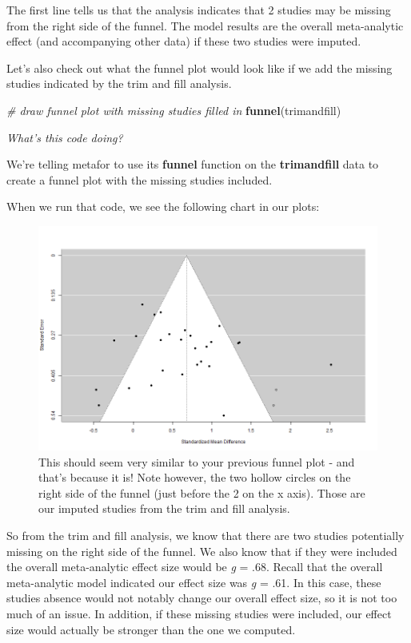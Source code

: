 \documentclass[
]{book}
\newenvironment{Shaded}{\begin{snugshade}}{\end{snugshade}}
\newcommand{\CommentTok}[1]{\textcolor[rgb]{0.56,0.35,0.01}{\textit{#1}}}
\newcommand{\FunctionTok}[1]{\textcolor[rgb]{0.13,0.29,0.53}{\textbf{#1}}}
\newcommand{\NormalTok}[1]{#1}
\begin{document}
The first line tells us that the analysis indicates that 2 studies may be missing from the right side of the funnel. The model results are the overall meta-analytic effect (and accompanying other data) if these two studies were imputed.

Let's also check out what the funnel plot would look like if we add the missing studies indicated by the trim and fill analysis.

\begin{Shaded}
\begin{Highlighting}[]
\CommentTok{\# draw funnel plot with missing studies filled in}
\FunctionTok{funnel}\NormalTok{(trimandfill)}
\end{Highlighting}
\end{Shaded}

\emph{What's this code doing?}

We're telling metafor to use its \textbf{funnel} function on the \textbf{trimandfill} data to create a funnel plot with the missing studies included.

When we run that code, we see the following chart in our plots:

\begin{figure}
\centering
\includegraphics[width=1\textwidth,height=\textheight]{images/clipboard-2269174522.png}
\caption{This should seem very similar to your previous funnel plot - and that's because it is! Note however, the two hollow circles on the right side of the funnel (just before the 2 on the x axis). Those are our imputed studies from the trim and fill analysis.}
\end{figure}

So from the trim and fill analysis, we know that there are two studies potentially missing on the right side of the funnel. We also know that if they were included the overall meta-analytic effect size would be \emph{g} = .68. Recall that the overall meta-analytic model indicated our effect size was \emph{g} = .61. In this case, these studies absence would not notably change our overall effect size, so it is not too much of an issue. In addition, if these missing studies were included, our effect size would actually be stronger than the one we computed.
\end{document}
